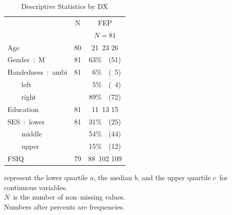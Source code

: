 \documentclass{article}\usepackage{graphicx, color}
\begin{document}
%
\begin{table}[h]
\scriptsize
\caption{Descriptive Statistics by DX\label{tab}} 
\begin{center}
\begin{tabular}{lrc}
\hline\hline
\multicolumn{1}{l}{}&\multicolumn{1}{c}{N}&\multicolumn{1}{c}{FEP}\tabularnewline
&&\multicolumn{1}{c}{{\scriptsize $N=81$}}\tabularnewline
\hline
Age&80&{\scriptsize 21~}{23 }{\scriptsize 26} \tabularnewline
Gender~:~M&81&63\%~{\scriptsize~(51)}\tabularnewline
Handedness~:~ambi&81&~6\%~{\scriptsize~(~5)}\tabularnewline
~~~~left&&~5\%~{\scriptsize~(~4)}\tabularnewline
~~~~right&&89\%~{\scriptsize~(72)}\tabularnewline
Education&81&{\scriptsize 11~}{13 }{\scriptsize 15} \tabularnewline
SES~:~lower&81&31\%~{\scriptsize~(25)}\tabularnewline
~~~~middle&&54\%~{\scriptsize~(44)}\tabularnewline
~~~~upper&&15\%~{\scriptsize~(12)}\tabularnewline
FSIQ&79&{\scriptsize  88~}{102 }{\scriptsize 109} \tabularnewline
\hline
\end{tabular}
\end{center}
 represent the lower quartile $a$, the median $b$, and the upper quartile $c$\ for continuous variables.\\$N$\ is the number of non--missing values.\\Numbers after percents are frequencies.\end{table}
\end{document}
